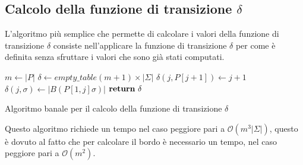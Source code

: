 \subsection{Calcolo della funzione di transizione $\delta$}
L'algoritmo più semplice che permette di calcolare i valori della funzione di
transizione $\delta$ consiste nell’applicare la funzione di transizione $\delta$ per
come è definita senza sfruttare i valori che sono già stati computati.
\begin{algorithm}
    \begin{algorithmic}
        \State $m\gets |P|$
        \State $\delta \gets empty\_table (m + 1) \times | \Sigma|$
        \State $\delta(j, P[j + 1]) \gets j + 1$
        \EndFor
        \For{$\sigma \in \Sigma$}
        \State $\delta(j, \sigma) \gets |B(P[1, j]\sigma)|$
        \EndFor
        \EndFor
        \State $\text{\textbf{return}} \ \delta$
        \EndFunction
    \end{algorithmic}
    \caption{Algoritmo banale per il calcolo della funzione di transizione $\delta$}
\end{algorithm}
Questo algoritmo richiede un tempo nel caso peggiore pari a $\mathcal{O}(m^3 | \Sigma|)$,
questo è dovuto al fatto che per calcolare il bordo è necessario un tempo, nel
caso peggiore pari a $\mathcal{O}(m^2)$.


